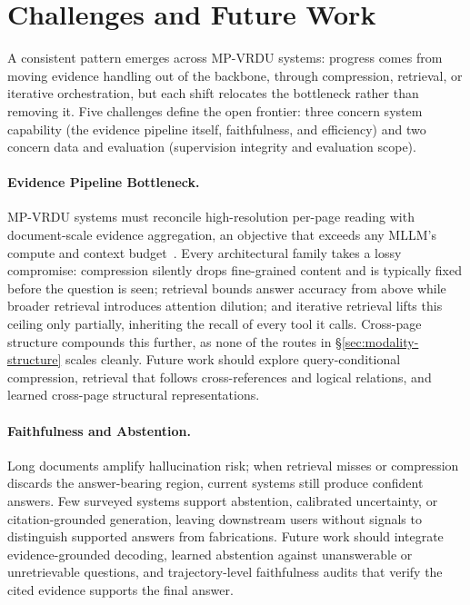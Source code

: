 \documentclass[11pt]{article}
\begin{document}
\section{Challenges and Future Work}
\label{sec:challenges}
A consistent pattern emerges across MP-VRDU systems: progress comes from moving evidence handling out of the backbone, through compression, retrieval, or iterative orchestration, but each shift relocates the bottleneck rather than removing it. Five challenges define the open frontier: three concern system capability (the evidence pipeline itself, faithfulness, and efficiency) and two concern data and evaluation (supervision integrity and evaluation scope).
\paragraph{Evidence Pipeline Bottleneck.}
\label{sec:evidence}
MP-VRDU systems must reconcile high-resolution per-page reading with document-scale evidence aggregation, an objective that exceeds any MLLM's compute and context budget~\cite{ma2024mmlongbench}. Every architectural family takes a lossy compromise: compression silently drops fine-grained content and is typically fixed before the question is seen; retrieval bounds answer accuracy from above while broader retrieval introduces attention dilution; and iterative retrieval lifts this ceiling only partially, inheriting the recall of every tool it calls. Cross-page structure compounds this further, as none of the routes in \S\ref{sec:modality-structure} scales cleanly. Future work should explore query-conditional compression, retrieval that follows cross-references and logical relations, and learned cross-page structural representations.

\paragraph{Faithfulness and Abstention.}
\label{sec:faithfulness}
Long documents amplify hallucination risk; when retrieval misses or compression discards the answer-bearing region, current systems still produce confident answers. Few surveyed systems support abstention, calibrated uncertainty, or citation-grounded generation, leaving downstream users without signals to distinguish supported answers from fabrications. Future work should integrate evidence-grounded decoding, learned abstention against unanswerable or unretrievable questions, and trajectory-level faithfulness audits that verify the cited evidence supports the final answer.
\end{document}
